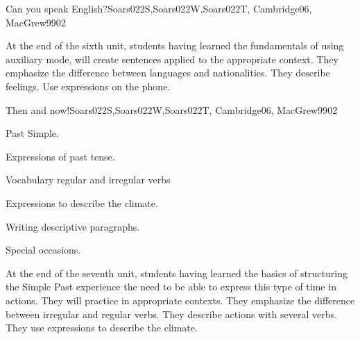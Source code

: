 \begin{syllabus}
\begin{unit}{Can you speak English?}{}{Soars022S,Soars022W,Soars022T, Cambridge06, MacGrew99}{0}{2}
   \begin{learningoutcomes}
      \item At the end of the sixth unit, students having learned the fundamentals of using auxiliary mode, will create sentences applied to the appropriate context. They emphasize the difference between languages and nationalities. They describe feelings. Use expressions on the phone.
   \end{learningoutcomes}

\end{unit}

\begin{unit}{Then and now!}{}{Soars022S,Soars022W,Soars022T, Cambridge06, MacGrew99}{0}{2}
   \begin{topics}
      \item Past Simple.
      \item Expressions of past tense.
      \item Vocabulary regular and irregular verbs
      \item Expressions to describe the climate. 
      \item Writing descriptive paragraphs.
      \item Special occasions.
   \end{topics}

   \begin{learningoutcomes}
      \item At the end of the seventh unit, students having learned the basics of structuring the Simple Past experience the need to be able to express this type of time in actions. They will practice in appropriate contexts. They emphasize the difference between irregular and regular verbs. They describe actions with several verbs. They use expressions to describe the climate.
   \end{learningoutcomes}
\end{unit}



\begin{coursebibliography}
\end{coursebibliography}
\end{syllabus}
%
